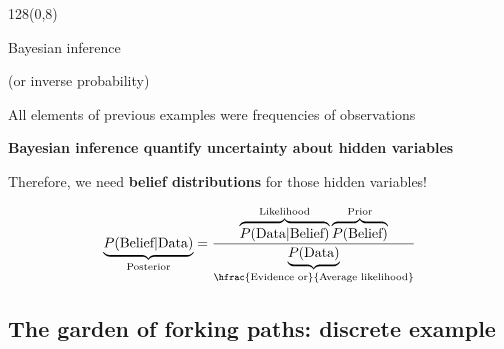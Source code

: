 \documentclass[shownotes]{beamer}
\begin{document}
\begin{frame}
\begin{textblock}{128}(0,8)
\begin{center}
 \Large Bayesian inference
 
 \normalsize (or inverse probability)
\end{center}
\end{textblock}
\vspace{0.9cm}

 \begin{framed}
 \centering
  All elements of previous examples were frequencies of observations
  
 \textbf{Bayesian inference quantify uncertainty about hidden variables}

 Therefore, we need \textbf{belief distributions} for those hidden variables!
 \end{framed} 

 \pause 

 \begin{equation}
  \underbrace{P(\text{Belief}|\text{Data})}_{\text{\scriptsize Posterior}} = \frac{\overbrace{P(\text{Data}|\text{Belief})}^{\text{\scriptsize Likelihood}} \overbrace{P(\text{Belief})}^{\text{\scriptsize Prior}} }{\underbrace{P(\text{Data})}_{\hfrac{\text{\scriptsize Evidence or}}{\text{\scriptsize Average likelihood}}}}
 \end{equation}

 \pause \vspace{0.3cm}
 
 
 


\end{frame}

\subsection{The garden of forking paths: discrete example}
\end{document}

